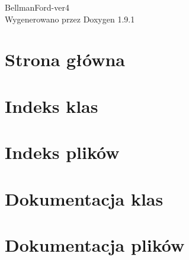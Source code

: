 \let\mypdfximage\pdfximage\def\pdfximage{\immediate\mypdfximage}\documentclass[twoside]{book}
\newcommand{\+}{\discretionary{\mbox{\scriptsize$\hookleftarrow$}}{}{}}
\newcommand{\clearemptydoublepage}{%
  \newpage{\pagestyle{empty}\cleardoublepage}%
}
\begin{document}
\raggedbottom

\hypersetup{pageanchor=false,
             bookmarksnumbered=true,
             pdfencoding=unicode
            }
\begin{titlepage}
\vspace*{7cm}
\begin{center}%
{\Large Bellman\+Ford-\/ver4 }\\
\vspace*{1cm}
{\large Wygenerowano przez Doxygen 1.9.1}\\
\end{center}
\end{titlepage}
\clearemptydoublepage
{}
\tableofcontents
\clearemptydoublepage
{}
\hypersetup{pageanchor=true}

\chapter{Strona główna}
\label{index}\hypertarget{index}{}
\chapter{Indeks klas}

\chapter{Indeks plików}

\chapter{Dokumentacja klas}


\chapter{Dokumentacja plików}






\backmatter
\newpage
{}
\clearemptydoublepage
{}
\printindex
\end{document}
